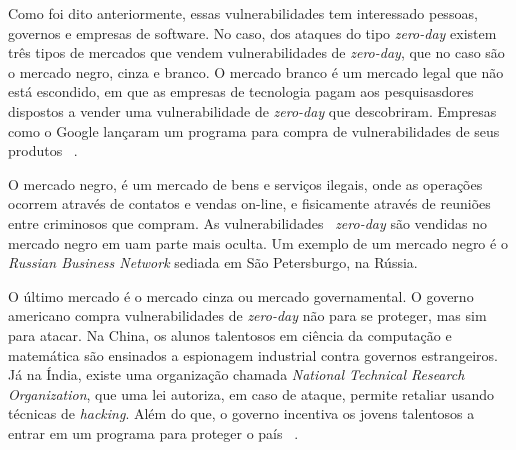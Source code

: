 Como foi dito anteriormente, essas vulnerabilidades tem interessado pessoas, governos e empresas de software. No caso, dos ataques do 
tipo \textit{zero-day} existem três tipos de mercados que vendem vulnerabilidades de \textit{zero-day}, que no caso são o mercado negro, 
cinza e branco. O mercado branco é um mercado legal que não está escondido, em que as empresas de tecnologia pagam aos pesquisasdores 
dispostos a vender uma vulnerabilidade de \textit{zero-day} que descobriram. Empresas como o Google lançaram um programa para compra de 
vulnerabilidades de seus produtos ~\cite{Fotiet:2015}. 

O mercado negro, é um mercado de bens e serviços ilegais, onde as operações ocorrem através de contatos e vendas on-line, e fisicamente 
através de reuniões entre criminosos que compram. As vulnerabilidades ~\textit{zero-day} são vendidas no mercado negro em uam parte mais 
oculta. Um exemplo de um mercado negro é o \textit{Russian Business Network} sediada em São Petersburgo, na Rússia. 

O último mercado é o mercado cinza ou mercado governamental. O governo americano compra vulnerabilidades de \textit{zero-day} não para se 
proteger, mas sim para atacar. Na China, os alunos talentosos em ciência da computação e matemática são ensinados a espionagem industrial 
contra governos estrangeiros. Já na Índia, existe uma organização chamada \textit{National Technical Research Organization}, que uma lei 
autoriza, em caso de ataque, permite retaliar usando técnicas de \textit{hacking}. Além do que, o governo incentiva os jovens talentosos 
a entrar em um programa para proteger o país ~\cite{Fotiet:2015}.


%
